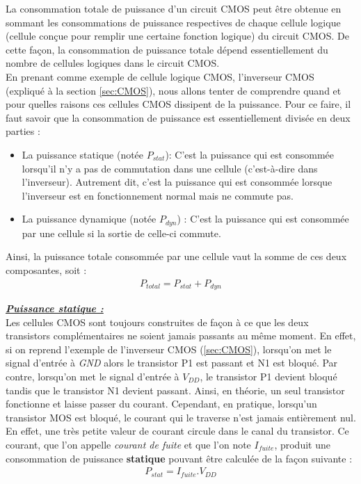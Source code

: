 \documentclass[oneside]{book}
\begin{document}
La consommation totale de puissance d'un circuit CMOS peut être obtenue en sommant les consommations de puissance respectives de chaque cellule logique (cellule conçue pour remplir une certaine fonction logique) du circuit CMOS. De cette façon, la consommation de puissance totale dépend essentiellement du nombre de cellules logiques dans le circuit CMOS. \\
En prenant comme exemple de cellule logique CMOS, l'inverseur CMOS (expliqué à la section \ref{sec:CMOS}), nous allons tenter de comprendre quand et pour quelles raisons ces cellules CMOS dissipent de la puissance. Pour ce faire, il faut savoir que la consommation de puissance est essentiellement divisée en deux parties : 
\begin{itemize}
\item La puissance statique (notée $P_{stat}$): C'est la puissance qui est consommée lorsqu'il n'y a pas de commutation dans une cellule (c'est-à-dire dans l'inverseur). Autrement dit, c'est la puissance qui est consommée lorsque l'inverseur est en fonctionnement normal mais ne commute pas.
\item La puissance dynamique (notée $P_{dyn}$) : C'est la puissance qui est consommée par une cellule si la sortie de celle-ci commute. 
\end{itemize}
Ainsi, la puissance totale consommée par une cellule vaut la somme de ces deux composantes, soit :
\begin{gather}
	P_{total} = P_{stat} + P_{dyn}
\end{gather}

\hspace{-0.5 cm}\underline{\textbf{\textit{Puissance statique :}}} \vspace{0.2 cm} \\
Les cellules CMOS sont toujours construites de façon à ce que les deux transistors complémentaires ne soient jamais passants au même moment. En effet, si on reprend l'exemple de l'inverseur CMOS (\ref{sec:CMOS}), lorsqu'on met le signal d'entrée à \textit{GND} alors le transistor P1 est passant et N1 est bloqué. Par contre, lorsqu'on met le signal d'entrée à \textit{$V_{DD}$}, le transistor P1 devient bloqué tandis que le transistor N1 devient passant. Ainsi, en théorie, un seul transistor fonctionne et laisse passer du courant. Cependant, en pratique, lorsqu'un transistor MOS est bloqué, le courant qui le traverse n'est jamais entièrement nul. En effet, une très petite valeur de courant circule dans le canal du transistor. Ce courant, que l'on appelle \textit{courant de fuite} et que l'on note \textit{$I_{fuite}$}, produit une consommation de puissance \textbf{statique} pouvant être calculée de la façon suivante :
\begin{gather}
	P_{stat} = I_{fuite} . V_{DD}
\end{gather}
\end{document}
